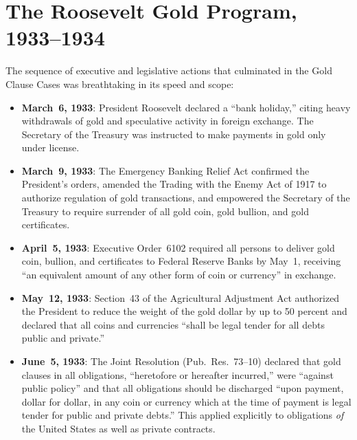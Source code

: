 \documentclass[12pt]{article}
\begin{document}
\section{The Roosevelt Gold Program, 1933--1934}

The sequence of executive and legislative actions that culminated in
the Gold Clause Cases was breathtaking in its speed and scope:

\begin{itemize}

\item \textbf{March~6, 1933}: President Roosevelt declared a ``bank
holiday,'' citing heavy withdrawals of gold and speculative activity in
foreign exchange. The Secretary of the Treasury was instructed to make
payments in gold only under license.

\item \textbf{March~9, 1933}: The Emergency Banking Relief Act
confirmed the President's orders, amended the Trading with the Enemy
Act of 1917 to authorize regulation of gold transactions, and empowered
the Secretary of the Treasury to require surrender of all gold coin,
gold bullion, and gold certificates.

\item \textbf{April~5, 1933}: Executive Order~6102 required all persons
to deliver gold coin, bullion, and certificates to Federal Reserve
Banks by May~1, receiving ``an equivalent amount of any other form of
coin or currency'' in exchange.

\item \textbf{May~12, 1933}: Section~43 of the Agricultural Adjustment
Act authorized the President to reduce the weight of the gold dollar by
up to 50 percent and declared that all coins and currencies ``shall be
legal tender for all debts public and private.''

\item \textbf{June~5, 1933}: The Joint Resolution (Pub.\ Res.\ 73--10)
declared that gold clauses in all obligations, ``heretofore or
hereafter incurred,'' were ``against public policy'' and that all
obligations should be discharged ``upon payment, dollar for dollar, in
any coin or currency which at the time of payment is legal tender for
public and private debts.'' This applied explicitly to obligations
\textit{of} the United States as well as private contracts.


\end{itemize}
\end{document}

